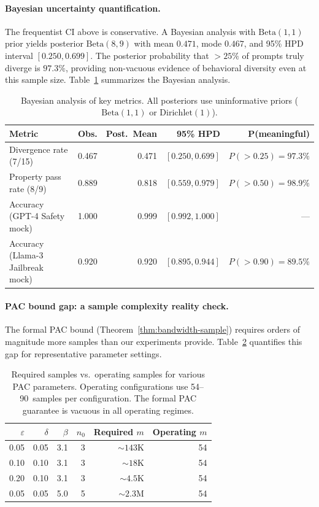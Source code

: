 \documentclass[11pt]{article}
\begin{document}
\paragraph{Bayesian uncertainty quantification.}
The frequentist CI above is conservative.  A Bayesian analysis with
$\mathrm{Beta}(1, 1)$ prior yields posterior
$\mathrm{Beta}(8, 9)$ with mean $0.471$, mode $0.467$, and
95\% HPD interval $[0.250, 0.699]$.  The posterior probability
that $>25\%$ of prompts truly diverge is $97.3\%$, providing
non-vacuous evidence of behavioral diversity even at this sample
size.  Table~\ref{tab:bayesian} summarizes the Bayesian analysis.

\begin{table}[t]
\centering
\caption{Bayesian analysis of key metrics.  All posteriors use
  uninformative priors ($\mathrm{Beta}(1,1)$ or $\mathrm{Dirichlet}(1)$).}
\label{tab:bayesian}
\small
\begin{tabular}{@{}lrrrr@{}}
\toprule
\textbf{Metric} & \textbf{Obs.} & \textbf{Post.\ Mean} & \textbf{95\% HPD} & \textbf{P(meaningful)} \\
\midrule
Divergence rate (7/15)       & 0.467 & 0.471 & $[0.250, 0.699]$ & $P(>0.25) = 97.3\%$ \\
Property pass rate (8/9)     & 0.889 & 0.818 & $[0.559, 0.979]$ & $P(>0.50) = 98.9\%$ \\
Accuracy (GPT-4 Safety mock)      & 1.000 & 0.999 & $[0.992, 1.000]$ & --- \\
Accuracy (Llama-3 Jailbreak mock) & 0.920 & 0.920 & $[0.895, 0.944]$ & $P(>0.90) = 89.5\%$ \\
\bottomrule
\end{tabular}
\end{table}

\paragraph{PAC bound gap: a sample complexity reality check.}\label{sec:sample-complexity-gap}
The formal PAC bound (Theorem~\ref{thm:bandwidth-sample}) requires
orders of magnitude more samples than our experiments provide.
Table~\ref{tab:pac-gap} quantifies this gap for representative
parameter settings.

\begin{table}[t]
\centering
\caption{Required samples vs.\ operating samples for various
  PAC parameters.  Operating configurations use 54--90~samples
  per configuration.  The formal
  PAC guarantee is vacuous in all operating regimes.}
\label{tab:pac-gap}
\small
\begin{tabular}{@{}rrrrrr@{}}
\toprule
$\varepsilon$ & $\delta$ & $\beta$ & $n_0$ & Required $m$ & Operating $m$ \\
\midrule
0.05 & 0.05 & 3.1 & 3 & ${\sim}143$K & 54 \\
0.10 & 0.10 & 3.1 & 3 & ${\sim}18$K & 54 \\
0.20 & 0.10 & 3.1 & 3 & ${\sim}4.5$K & 54 \\
0.05 & 0.05 & 5.0 & 5 & ${\sim}2.3$M & 54 \\
\bottomrule
\end{tabular}
\end{table}
\end{document}
